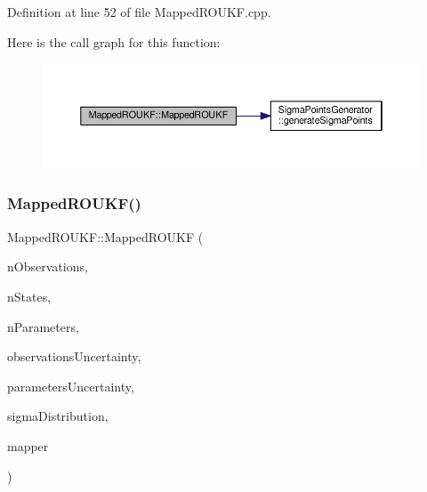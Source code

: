 Definition at line 52 of file Mapped\+R\+O\+U\+K\+F.\+cpp.

Here is the call graph for this function\+:\nopagebreak
\begin{figure}[H]
\begin{center}
\leavevmode
\includegraphics[width=350pt]{classMappedROUKF_a0febaff07fa4b563653ed83ab9f3a753_cgraph}
\end{center}
\end{figure}
\mbox{\label{classMappedROUKF_a37d0e3963e90076ce32f41189e088ed0}} 
\subsubsection{\texorpdfstring{Mapped\+R\+O\+U\+K\+F()}{MappedROUKF()}\hspace{0.1cm}{\footnotesize\ttfamily [3/3]}}
{\footnotesize\ttfamily Mapped\+R\+O\+U\+K\+F\+::\+Mapped\+R\+O\+U\+KF (\begin{DoxyParamCaption}\item[{int}]{n\+Observations,  }\item[{int}]{n\+States,  }\item[{int}]{n\+Parameters,  }\item[{vector$<$ double $>$}]{observations\+Uncertainty,  }\item[{vector$<$ double $>$}]{parameters\+Uncertainty,  }\item[{\mbox{\hyperlink{classSigmaPointsGenerator_ad6f9474c0313425a10add120e0acf944}{Sigma\+Points\+Generator\+::\+S\+I\+G\+M\+A\+\_\+\+D\+I\+S\+T\+R\+I\+B\+U\+T\+I\+ON}}}]{sigma\+Distribution,  }\item[{\mbox{\hyperlink{classCompositeParameterMapper}{Composite\+Parameter\+Mapper}} $\ast$}]{mapper }\end{DoxyParamCaption})}


